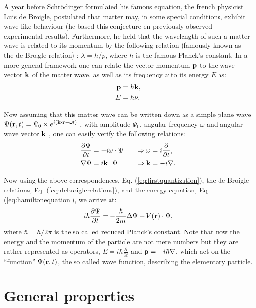 \documentclass[11pt,a4paper]{report}
\def\Nabla{\ensuremath\bm{\nabla}}
\def\bm{\ensuremath\mathbf}
\def\lap{\ensuremath\Delta}
\begin{document}
A year before Schr\"odinger formulated his famous equation, the french physicist Luis de Broigle, postulated that matter may, in some special conditions, exhibit wave-like behaviour (he based this conjecture on previously observed
experimental results). Furthermore, he held that the wavelength of such a matter wave is related to its momentum by the following relation (famously known as the de Broigle relation) : $\lambda = h/p$, where $h$ is the famous Planck's constant. In a more general framework one can relate the vector momentum $\bm{p}$ to the wave vector $\bm{k}$ of the matter wave, as well as its frequency $\nu$ to its energy $E$ as: 
\begin{align}
  \bm{p} &= h \bm{k}, \nonumber \\
  E &= h \nu  \label{eq:debroiglerelations}.
\end{align}

Now assuming that this matter wave can be written down as a simple plane wave $\Psi(\bm{r},t) = \Psi_0 \times e^{i(\bm{k}\cdot \bm{r}-\omega t)}$ , with amplitude $\Psi_0$, angular frequency $\omega$ and angular wave vector $\bm{k}$ , one can easily verify the following relations:
\begin{alignat}{2}
  \frac{\partial \Psi}{\partial t} &= -i\omega \cdot \Psi &\quad \Rightarrow \omega &= i\frac{\partial }{\partial t}, \nonumber \\ 
  \Nabla \Psi &= i\bm{k}\cdot\Psi &\quad \Rightarrow \bm{k} &= -i\Nabla. \label{eq:firstquantization}
\end{alignat}

Now using the above correspondences, Eq. (\ref{eq:firstquantization}), the de Broigle relations, Eq. (\ref{eq:debroiglerelations}), and the energy equation, Eq. (\ref{eq:hamiltonequation}), we arrive at:
\begin{equation}
  \label{eq:schroedingerequation}
  i\hbar \frac{\partial \Psi}{\partial t} = -\frac{\hbar}{2m}\lap \Psi + V(\bm{r})\cdot \Psi,
\end{equation}
where $\hbar = h/2\pi$ is the so called reduced Planck's constant. Note that now the energy and the momentum of the particle are not mere numbers but they are rather represented as operators, $E = i\hbar \frac{\partial }{\partial t}$ and $\bm{p}=-i\hbar \Nabla$, which act on the ``function'' $\Psi(\bm{r},t)$, the so called wave function, describing the elementary particle. 

\section{General properties}
\end{document}
